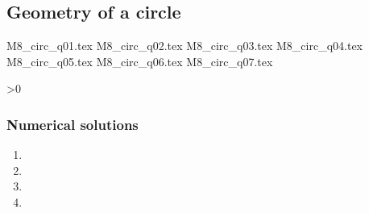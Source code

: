 \subsection{Geometry of a circle}

\begin{questions}

{M8_circ_q01.tex}
{M8_circ_q02.tex}
{M8_circ_q03.tex}
{M8_circ_q04.tex}
	\newpageWorkedSols{}
{M8_circ_q05.tex}	
	\newpageWorkedSols{}
{M8_circ_q06.tex}	
	\newpageWorkedSols{}
{M8_circ_q07.tex}	

\ifnum\value{printSols}>0
	\subsubsection*{Numerical solutions}
	\setcounter{solNo}{2}
	\begin{enumerate}
		\item \printSolutionAndInc{} %
		\item \printSolutionAndInc{} %
		\item \printSolutionAndInc{} %
		\item \printSolutionAndInc{} %
	\end{enumerate}
	\else
\fi

\end{questions}